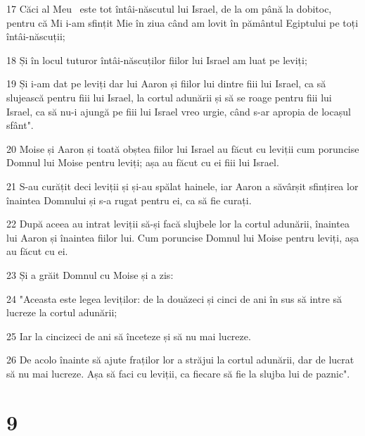 \par 17 Căci al Meu  este tot întâi-născutul lui Israel, de la om până la dobitoc, pentru că Mi i-am sfințit Mie în ziua când am lovit în pământul Egiptului pe toți întâi-născuții;
\par 18 Și în locul tuturor întâi-născuților fiilor lui Israel am luat pe leviți;
\par 19 Și i-am dat pe leviți dar lui Aaron și fiilor lui dintre fiii lui Israel, ca să slujească pentru fiii lui Israel, la cortul adunării și să se roage pentru fiii lui Israel, ca să nu-i ajungă pe fiii lui Israel vreo urgie, când s-ar apropia de locașul sfânt".
\par 20 Moise și Aaron și toată obștea fiilor lui Israel au făcut cu leviții cum poruncise Domnul lui Moise pentru leviți; așa au făcut cu ei fiii lui Israel.
\par 21 S-au curățit deci leviții și și-au spălat hainele, iar Aaron a săvârșit sfințirea lor înaintea Domnului și s-a rugat pentru ei, ca să fie curați.
\par 22 După aceea au intrat leviții să-și facă slujbele lor la cortul adunării, înaintea lui Aaron și înaintea fiilor lui. Cum poruncise Domnul lui Moise pentru leviți, așa au făcut cu ei.
\par 23 Și a grăit Domnul cu Moise și a zis:
\par 24 "Aceasta este legea leviților: de la douăzeci și cinci de ani în sus să intre să lucreze la cortul adunării;
\par 25 Iar la cincizeci de ani să înceteze și să nu mai lucreze.
\par 26 De acolo înainte să ajute fraților lor a străjui la cortul adunării, dar de lucrat să nu mai lucreze. Așa să faci cu leviții, ca fiecare să fie la slujba lui de paznic".

\chapter{9}

